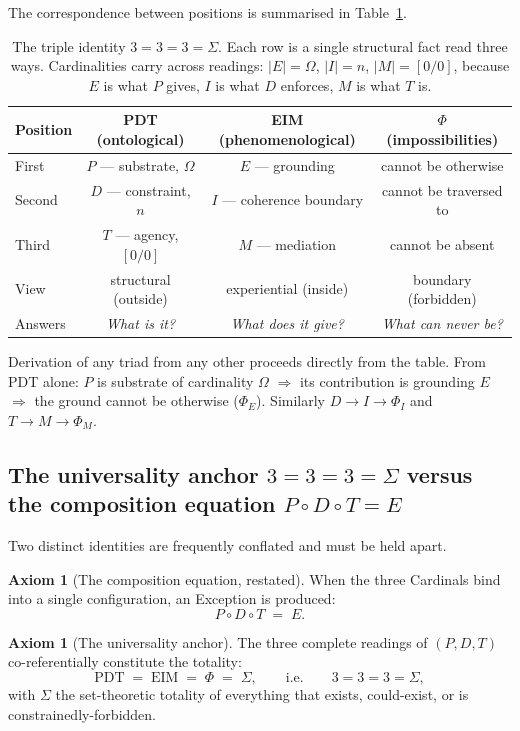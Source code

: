 \documentclass[11pt,a4paper]{article}
\theoremstyle{definition}
\newtheorem{axiom}[theorem]{Axiom}
\theoremstyle{remark}
\begin{document}
The correspondence between positions is summarised in Table~\ref{tab:triads}.

\begin{table}[h]
\centering
\begin{tabular}{@{}l c c c@{}}
\toprule
Position & PDT (ontological) & EIM (phenomenological) & $\Phi$ (impossibilities)\\
\midrule
First & $P$ --- substrate, $\Omega$ & $E$ --- grounding & cannot be otherwise\\
Second & $D$ --- constraint, $n$ & $I$ --- coherence boundary & cannot be traversed to\\
Third & $T$ --- agency, $[0/0]$ & $M$ --- mediation & cannot be absent\\
\addlinespace
View & structural (outside) & experiential (inside) & boundary (forbidden)\\
Answers & \textit{What is it?} & \textit{What does it give?} & \textit{What can never be?}\\
\bottomrule
\end{tabular}
\caption{The triple identity $3=3=3=\Sigma$. Each row is a single structural fact read three ways. Cardinalities carry across readings: $|E|=\Omega$, $|I|=n$, $|M|=[0/0]$, because $E$ is what $P$ gives, $I$ is what $D$ enforces, $M$ is what $T$ is.}
\label{tab:triads}
\end{table}

Derivation of any triad from any other proceeds directly from the table. From PDT alone: $P$ is substrate of cardinality $\Omega$ $\Rightarrow$ its contribution is grounding $E$ $\Rightarrow$ the ground cannot be otherwise ($\Phi_{E}$). Similarly $D \to I \to \Phi_{I}$ and $T \to M \to \Phi_{M}$.

\subsection{The universality anchor $3=3=3=\Sigma$ versus the composition equation $P\circ D\circ T = E$}\label{subsec:anchor}

Two distinct identities are frequently conflated and must be held apart.

\begin{axiom}[The composition equation, restated]\label{ax:composition}
When the three Cardinals bind into a single configuration, an Exception is produced:
\[
P \circ D \circ T \;=\; E.
\]
\end{axiom}

\begin{axiom}[The universality anchor]\label{ax:anchor}
The three complete readings of $(P,D,T)$ co-referentially constitute the totality:
\[
\mathrm{PDT} \;=\; \mathrm{EIM} \;=\; \Phi \;=\; \Sigma, \qquad \text{i.e.} \qquad 3=3=3=\Sigma,
\]
with $\Sigma$ the set-theoretic totality of everything that exists, could-exist, or is constrainedly-forbidden.
\end{axiom}
\end{document}
